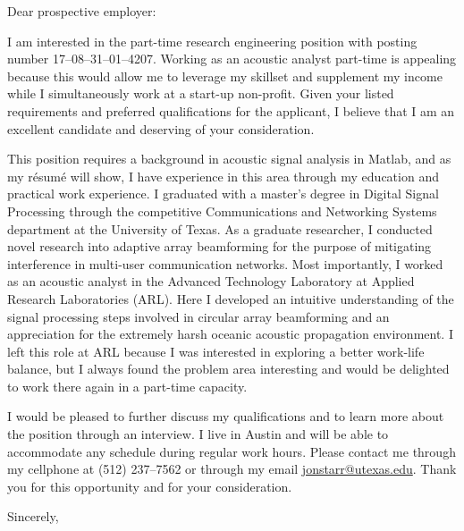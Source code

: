 \documentclass{letter}
\begin{document}
\begin{letter}{}
\opening{Dear prospective employer:}

I am interested in the part-time research engineering position with posting number 17--08--31--01--4207.
Working as an acoustic analyst part-time is appealing because this would
    allow me to leverage my skillset and
    supplement my income while I simultaneously work at a start-up non-profit.
Given your listed requirements and preferred qualifications for the applicant,
I believe that I am an excellent candidate and deserving of your consideration.

This position requires a background in acoustic signal analysis in Matlab, and as my r\'{e}sum\'{e} will show,
I have experience in this area through my education and practical work experience.
I graduated with a master's degree in Digital Signal Processing through the competitive Communications and Networking Systems department at the University of Texas.
As a graduate researcher,
I conducted novel research into adaptive array beamforming for the purpose of mitigating interference in multi-user communication networks.
Most importantly,
I worked as an acoustic analyst in the Advanced Technology Laboratory at Applied Research Laboratories (ARL).
Here I developed
    an intuitive understanding of the signal processing steps involved in circular array beamforming and
    an appreciation for the extremely harsh oceanic acoustic propagation environment.
I left this role at ARL because I was interested in exploring a better work-life balance, but
I always found the problem area interesting and would be delighted to work there again in a part-time capacity.

I would be pleased to further discuss my qualifications and to learn more about the position through an interview.
I live in Austin and will be able to accommodate any schedule during regular work hours.
Please contact me through my cellphone at (512) 237--7562 or through my email \vbox{\href{mailto:jonstarr@utexas.edu}{jonstarr@utexas.edu}.}
Thank you for this opportunity and for your consideration.

\closing{Sincerely,}


\end{letter}
\end{document}
